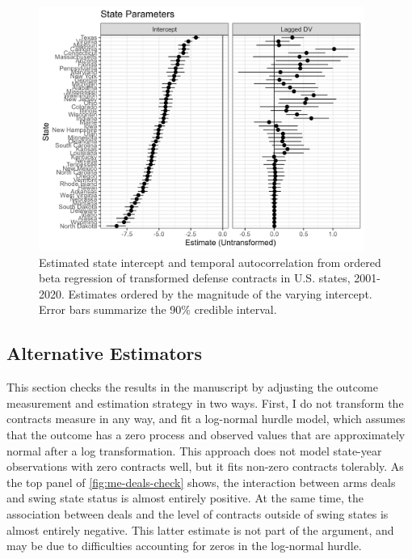 \documentclass[12pt]{article}
\begin{document}
\begin{figure}[htpb]
	\centering
		\includegraphics[width=0.95\textwidth]{state-pars.png}
	\caption{Estimated state intercept and temporal autocorrelation from ordered beta regression of transformed defense contracts in U.S. states, 2001-2020. Estimates ordered by the magnitude of the varying intercept. Error bars summarize the 90\% credible interval.}
	\label{fig:state-pars}
\end{figure}


\subsection{Alternative Estimators}

This section checks the results in the manuscript by adjusting the outcome measurement and estimation strategy in two ways.
First, I do not transform the contracts measure in any way, and fit a log-normal hurdle model, which assumes that the outcome has a zero process and observed values that are approximately normal after a log transformation. 
This approach does not model state-year observations with zero contracts well, but it fits non-zero contracts tolerably. 
As the top panel of \autoref{fig:me-deals-check} shows, the interaction between arms deals and swing state status is almost entirely positive.
At the same time, the association between deals and the level of contracts outside of swing states is almost entirely negative. 
This latter estimate is not part of the argument, and may be due to difficulties accounting for zeros in the log-normal hurdle. 
 
\end{document}
